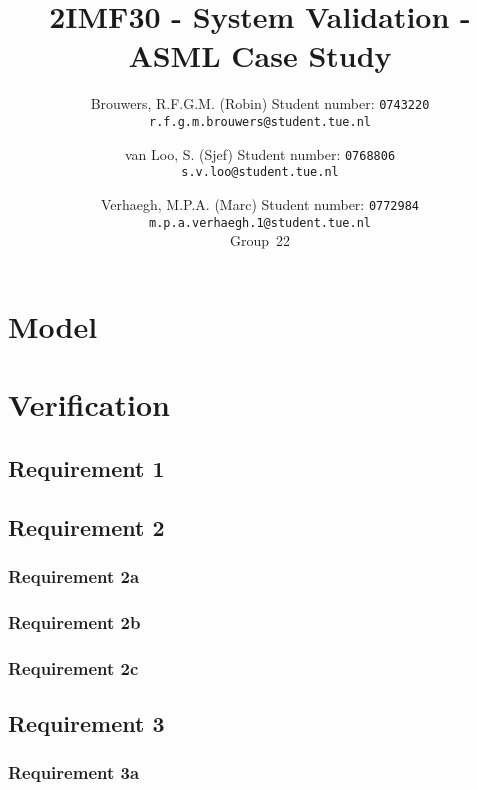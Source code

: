 \documentclass[a4paper]{article}
\title{2IMF30 - System Validation - ASML Case Study}
\author{
    Brouwers, R.F.G.M. (Robin) \qquad Student number: \texttt{0743220} \\
    \texttt{r.f.g.m.brouwers@student.tue.nl}
    \and
    van Loo, S. (Sjef) \qquad Student number: \texttt{0768806} \\
    \texttt{s.v.loo@student.tue.nl}
    \and
    Verhaegh, M.P.A. (Marc) \qquad Student number: \texttt{0772984} \\
    \texttt{m.p.a.verhaegh.1@student.tue.nl} \\
    Group~22
}
\begin{document}
    \maketitle
    \clearpage
    \tableofcontents
    \clearpage

    
    
    
    
    
    
    
    

    \clearpage
    \appendix
    \section{Model}\label{sec:model}
    

    \section{Verification}\label{sec:mcf}
    \subsection{Requirement 1}
    

    \subsection{Requirement 2}
    \subsubsection{Requirement 2a}
    

    \subsubsection{Requirement 2b}
    

    \subsubsection{Requirement 2c}
    

    \subsection{Requirement 3}
    \subsubsection{Requirement 3a}
    
\end{document}
